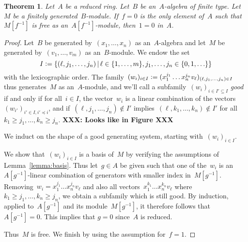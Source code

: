 \documentclass{amsart}
\theoremstyle{definition}
\theoremstyle{plain}
\newtheorem{thm}[defn]{Theorem}
\theoremstyle{remark}
\newcommand{\XXX}[1]{\textbf{XXX: #1}}
\newcommand{\defeq}{\vcentcolon=}
\begin{document}
\begin{thm}Let~$A$ be a reduced ring. Let~$B$ be an~$A$-algebra of finite type.
Let~$M$ be a finitely generated~$B$-module. If~$f = 0$ is the only element
of~$A$ such that~$M[f^{-1}]$ is free as an~$A[f^{-1}]$-module, then~$1 = 0$
in~$A$.\end{thm}

\begin{proof}Let~$B$ be generated by~$(x_1,\ldots,x_n)$ as an~$A$-algebra and
let~$M$ be generated by~$(v_1,\ldots,v_m)$ as an~$B$-module. We endow the set
\[ I \defeq \{ (\ell, j_1,\ldots,j_n) \,|\,
  \ell \in \{ 1,\ldots,m \},
  j_1,\ldots,j_n \in \{ 0,1,\ldots \} \} \]
with the lexicographic order. The family~$(w_i)_{i \in I} \defeq (x_1^{j_1}
\ldots x_n^{j_n} v_\ell)_{(\ell,j_1,\ldots,j_n) \in I}$ thus generates~$M$ as
an~$A$-module, and we'll call a subfamily~$(w_i)_{i \in I' \subseteq I}$
\emph{good} if and only if for all~$i \in I$, the vector~$w_i$ is a linear
combination of the vectors~$(w_{i'})_{i' \in I, i' \preceq i}$,
and if~$(\ell,j_1,\ldots,j_n) \not\in I'$ implies~$(\ell,k_1,\ldots,k_n) \not\in
I'$ for all~$k_1 \geq j_1, \ldots, k_n \geq j_n$. \XXX{Looks like in Figure XXX}

We induct on the shape of a good generating system, starting with~$(w_i)_{i \in I}$.

We show that~$(w_i)_{i \in I}$ is a basis of~$M$ by verifying the assumptions
of Lemma~\ref{lemma:basis}. Thus let~$g \in A$ be given such that one of
the~$w_i$ is an $A[g^{-1}]$-linear combination of generators with smaller index
in~$M[g^{-1}]$. Removing~$w_i = x_1^{j_1} \ldots x_n^{j_n} v_\ell$ and also all
vectors~$x_1^{k_1} \ldots x_n^{k_n} v_\ell$ where~$k_1 \geq j_1, \ldots, k_n
\geq j_n$, we obtain a subfamily which is still good. By induction, applied
to~$A[g^{-1}]$ and its module~$M[g^{-1}]$, it therefore follows that $A[g^{-1}] = 0$.
This implies that $g = 0$ since~$A$ is reduced.

Thus~$M$ is free. We finish by using the assumption for~$f = 1$.
\end{proof}
\end{document}
